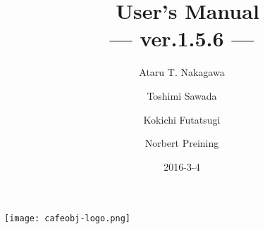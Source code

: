 \documentclass[a4paper]{memoir}
\begin{document}
\tightlists
\midsloppy
{}
\frontmatter
\pagestyle{empty}
\title{\cafeobj~User's Manual \\ --- ver.1.5.6 ---}
\author{Ataru T. Nakagawa \and Toshimi Sawada \and Kokichi Futatsugi
  \and Norbert Preining}
\date{2016-3-4}


\maketitle
\vfill
\begin{center}
\texttt{[image: cafeobj-logo.png]}
\end{center}
\vfill
\thispagestyle{empty}


\clearpage
\newpage
\pagestyle{headings}
\tableofcontents
\clearpage

\pagestyle{ruled}
\end{document}
